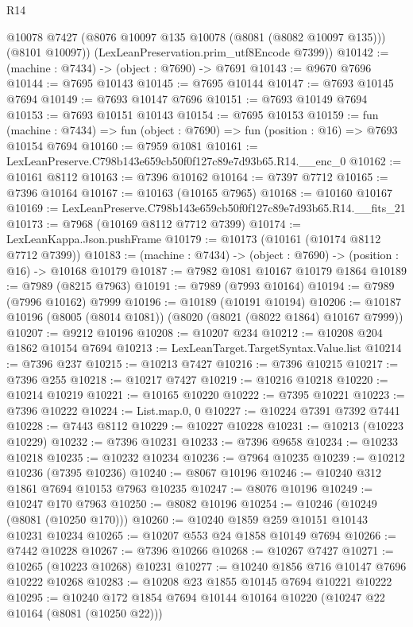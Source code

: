 \begin{lexlean}{R14}
\begin{coremodule}
        @10078
        @7427
        (@8076 @10097 @135 @10078 (@8081 (@8082 @10097 @135)))
        (@8101 @10097))
      (LexLeanPreservation.prim_utf8Encode @7399))
@10142 := (machine : @7434) -> (object : @7690) -> @7691
@10143 := @9670 @7696
@10144 := @7695 @10143
@10145 := @7695 @10144
@10147 := @7693 @10145 @7694
@10149 := @7693 @10147 @7696
@10151 := @7693 @10149 @7694
@10153 := @7693 @10151 @10143
@10154 := @7695 @10153
@10159 := fun (machine : @7434) =>
  fun (object : @7690) => fun (position : @16) => @7693 @10154 @7694
@10160 := @7959 @1081
@10161 := LexLeanPreserve.C798b143e659cb50f0f127c89e7d93b65.R14.__enc_0
@10162 := @10161 @8112
@10163 := @7396 @10162
@10164 := @7397 @7712
@10165 := @7396 @10164
@10167 := @10163 (@10165 @7965)
@10168 := @10160 @10167
@10169 := LexLeanPreserve.C798b143e659cb50f0f127c89e7d93b65.R14.__fits_21
@10173 := @7968 (@10169 @8112 @7712 @7399)
@10174 := LexLeanKappa.Json.pushFrame
@10179 := @10173 (@10161 (@10174 @8112 @7712 @7399))
@10183 := (machine : @7434) -> (object : @7690) -> (position : @16) -> @10168 @10179
@10187 := @7982 @1081 @10167 @10179 @1864
@10189 := @7989 (@8215 @7963)
@10191 := @7989 (@7993 @10164)
@10194 := @7989 (@7996 @10162) @7999
@10196 := @10189 (@10191 @10194)
@10206 := @10187 @10196 (@8005 (@8014 @1081)) (@8020 (@8021 (@8022 @1864) @10167 @7999))
@10207 := @9212 @10196
@10208 := @10207 @234
@10212 := @10208 @204 @1862 @10154 @7694
@10213 := LexLeanTarget.TargetSyntax.Value.list
@10214 := @7396 @237
@10215 := @10213 @7427
@10216 := @7396 @10215
@10217 := @7396 @255
@10218 := @10217 @7427
@10219 := @10216 @10218
@10220 := @10214 @10219
@10221 := @10165 @10220
@10222 := @7395 @10221
@10223 := @7396 @10222
@10224 := List.map.{0, 0}
@10227 := @10224 @7391 @7392 @7441
@10228 := @7443 @8112
@10229 := @10227 @10228
@10231 := @10213 (@10223 @10229)
@10232 := @7396 @10231
@10233 := @7396 @9658
@10234 := @10233 @10218
@10235 := @10232 @10234
@10236 := @7964 @10235
@10239 := @10212 @10236 (@7395 @10236)
@10240 := @8067 @10196
@10246 := @10240 @312 @1861 @7694 @10153 @7963 @10235
@10247 := @8076 @10196
@10249 := @10247 @170 @7963
@10250 := @8082 @10196
@10254 := @10246 (@10249 (@8081 (@10250 @170)))
@10260 := @10240 @1859 @259 @10151 @10143 @10231 @10234
@10265 := @10207 @553 @24 @1858 @10149 @7694
@10266 := @7442 @10228
@10267 := @7396 @10266
@10268 := @10267 @7427
@10271 := @10265 (@10223 @10268) @10231
@10277 := @10240 @1856 @716 @10147 @7696 @10222 @10268
@10283 := @10208 @23 @1855 @10145 @7694 @10221 @10222
@10295 := @10240 @172 @1854 @7694 @10144 @10164 @10220 (@10247 @22 @10164 (@8081 (@10250 @22)))

\end{coremodule}
\end{lexlean}
